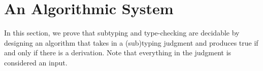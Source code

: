 
\chapter{An Algorithmic System}

In this section, we prove that subtyping and type-checking are decidable by designing an algorithm that takes in a (sub)typing judgment and produces true if and only if there is a derivation. Note that everything in the judgment is considered an input.



